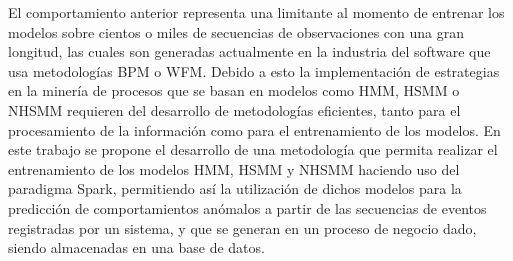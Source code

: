 El comportamiento anterior representa una limitante al momento de entrenar los modelos sobre cientos o miles de secuencias de observaciones con una gran longitud, las cuales son generadas actualmente en la industria del software que usa metodologías BPM o WFM. Debido a esto la implementación de estrategias en la minería de procesos que se basan en modelos como HMM, HSMM o NHSMM requieren del desarrollo de metodologías eficientes, tanto para el procesamiento de la información como para el entrenamiento de los modelos. En este trabajo se propone el desarrollo de una metodología que permita realizar el entrenamiento de los modelos HMM, HSMM y NHSMM haciendo uso del paradigma Spark, permitiendo así la utilización de dichos modelos para la predicción de comportamientos anómalos a partir de las secuencias de eventos registradas por un sistema, y que se generan en un proceso de negocio dado, siendo almacenadas en una base de datos.


